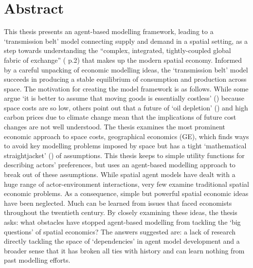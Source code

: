 \clearpage{\pagestyle{empty}\cleardoublepage}


\chapter*{Abstract}
\thispagestyle{empty}

This thesis presents an agent-based modelling framework, leading to a `transmission belt' model connecting supply and demand in a spatial setting, as a step towards understanding the ``complex, integrated, tightly-coupled global fabric of exchange'' (\citealt{korowicz_tipping_2010} p.2) that makes up the modern spatial economy. Informed by a careful unpacking of economic modelling ideas, the `transmission belt' model succeeds in producing a stable equilibrium of consumption and production across space. The motivation for creating the model framework is as follows. While some argue `it is better to assume that moving goods is essentially costless' (\citealt{glaeser_cities_2004}) because space costs are so low, others point out that a future of `oil depletion' (\citealt{sorrell_assessment_2009}) and high carbon prices due to climate change mean that the implications of future cost changes are not well understood. The thesis examines the most prominent economic approach to space costs, geographical economics (GE), which finds ways to avoid key modelling problems imposed by space but has a tight `mathematical straightjacket' (\citealt{martin_new_1999}) of assumptions. This thesis keeps to simple utility functions for describing actors' preferences, but uses an agent-based modelling approach to break out of these assumptions. While spatial agent models have dealt with a huge range of actor-environment interactions, very few examine traditional spatial economic problems. As a consequence, simple but powerful spatial economic ideas have been neglected. Much can be learned from issues that faced economists throughout the twentieth century. By closely examining these ideas, the thesis asks: what obstacles have stopped agent-based modelling from tackling the `big questions' of spatial economics? The answers suggested are: a lack of research directly tackling the space of `dependencies' in agent model development and a broader sense that it has broken all ties with history and can learn nothing from past modelling efforts.

